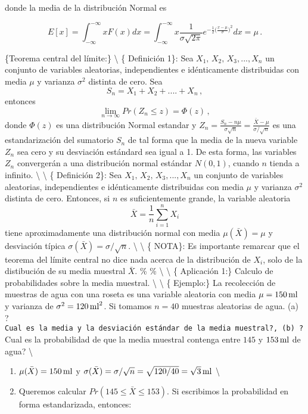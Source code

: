 \documentclass[
]{agujournal2019}
\providecommand{\tightlist}{%
  \setlength{\itemsep}{0pt}\setlength{\parskip}{0pt}}\usepackage{longtable,booktabs,array}
\begin{document}
donde la media de la distribución Normal es

\[E[x]=\int^{-\infty}_{-\infty} x F(x) dx=\int^{-\infty}_{-\infty} x \frac{1}{\sigma \sqrt{2\pi}}
e^ {-\frac{1}{2} \big( \frac{x-\mu}{\sigma} \big)^2 } dx=\mu\,.\]

\vspace{0.5cm}

\{\noindent  Teorema central del límite:\} \textbackslash{} \{
Definición 1\}: Sea \(X_1,\,X_2,\,X_3,...,X_n\) un conjunto de variables
aleatorias, independientes e idénticamente distribuidas con media
\(\mu\) y varianza \(\sigma^2\) distinta de cero. Sea
\[S_n=X_1+X_2+....+X_n\,,\] entonces
\[\lim_{n \to\infty} Pr (Z_n\le z)= \Phi(z)\,,\] donde \(\Phi(z)\) es
una distribución Normal estandar y
\(Z_n=\frac{S_n - n\mu} {\sigma\sqrt{n}} = \frac{\bar{X} - \mu} {\sigma/\sqrt{n}}\)
es una estandarización del sumatorio \(S_n\) de tal forma que la media
de la nueva variable \(Z_n\) sea cero y su desviación estándard sea
igual a 1. De esta forma, las variables \(Z_n\) convergerán a una
distribución normal estándar \(N(0,1)\), cuando \(n\) tienda a infinito.
\textbackslash{} \textbackslash{} \{ Definición 2\}: Sea
\(X_1,\,X_2,\,X_3,...,X_n\) un conjunto de variables aleatorias,
independientes e idénticamente distribuidas con media \(\mu\) y varianza
\(\sigma^2\) distinta de cero. Entonces, si \(n\) es suficientemente
grande, la variable aleatoria \[\bar{X}=\frac{1}{n}\sum^n_{i=1}{X_i}\]
tiene aproximadamente una distribución normal con media
\(\mu(\bar{X})=\mu\) y desviación típica
\(\sigma(\bar{X})=\sigma/\sqrt{n}\). \textbackslash{} \textbackslash{}
\{ NOTA\}: Es importante remarcar que el teorema del límite central no
dice nada acerca de la distribución de \(X_i\), solo de la distibución
de su media muestral \(\bar{X}\). \% \% \textbackslash{}
\textbackslash{} \{ Aplicación 1:\} Calculo de probabilidades sobre la
media muestral. \textbackslash{} \textbackslash{} \{ Ejemplo:\} La
recolección de muestras de agua con una roseta es una variable aleatoria
con media \(\mu=150\,{\rm ml}\) y varianza de
\(\sigma^2=120\,{\rm ml}^2\). Si tomamos \(n=40\) muestras aleatorias de
agua. (a)
?\texttt{Cual\ es\ la\ media\ y\ la\ desviación\ estándar\ de\ la\ media\ muestral?,\ (b)\ ?}Cual
es la probabilidad de que la media muestral contenga entre \(145\) y
\(153\,{\rm ml}\) de agua? \textbackslash{}

\begin{enumerate}
\def\labelenumi{(\alph{enumi})}
\tightlist
\item
  \(\mu(\bar{X})=150\,{\rm ml}\) y
  \(\sigma(\bar{X})=\sigma/\sqrt{n}=\sqrt{120/40}= \sqrt{3}\,{\rm ml}\)
  \textbackslash{}
\item
  Queremos calcular \(Pr(145 \le \bar{X} \le 153)\). Si escribimos la
  probabilidad en forma estandarizada, entonces:
\end{enumerate}
\end{document}
